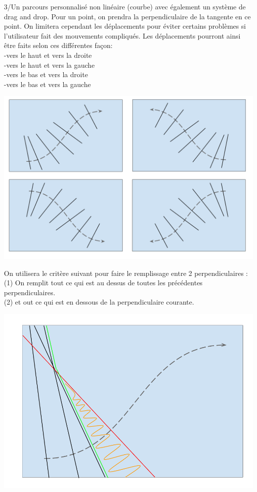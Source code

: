 \documentclass[a4paper,12pt]{report}
\begin{document}
3/Un parcours personnalisé non linéaire (courbe) avec également un système de drag and drop. Pour un point, on prendra la perpendiculaire de la tangente en ce point.
On limitera cependant les déplacements pour éviter certains problèmes si l’utilisateur fait des mouvements compliqués.
Les déplacements pourront ainsi être faits selon ces différentes façon:
\\\indent -vers le haut et vers la droite
\\\indent -vers le haut et vers la gauche 
\\\indent -vers le bas et vers la droite
\\\indent -vers le bas et vers la gauche
\begin{center}
 \includegraphics[scale=0.2]{./obturateur3.png}
\end{center}\newpage
On utilisera le critère suivant pour faire le remplissage entre 2 perpendiculaires :
\\\indent (1) On remplit tout ce qui est au dessus de toutes les précédentes perpendiculaires.
\\\indent (2) et out ce qui est en dessous de la perpendiculaire courante.
\begin{center}
 \includegraphics[scale=0.2]{./obturateur3exp.png}
\end{center}\par\bigskip
\end{document}
